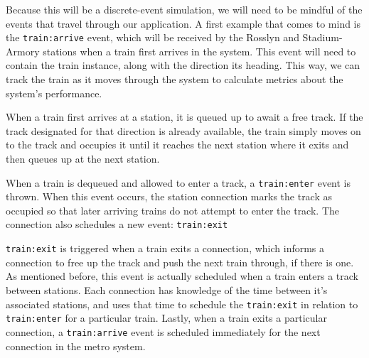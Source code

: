 \documentclass[a4paper,12pt]{article}
\begin{document}
Because this will be a discrete-event simulation, we will need to be mindful of the events that travel through our
application. A first example that comes to mind is the \texttt{train:arrive} event, which will be received by the
Rosslyn and Stadium-Armory stations when a train first arrives in the system. This event will need to contain the train
instance, along with the direction its heading. This way, we can
track the train as it moves through the system to calculate metrics about the system's performance.

When a train first arrives at a station, it is queued up to await a free track. If the track designated for that
direction is already available, the train simply moves on to the track and occupies it until it reaches the next
station where it exits and then queues up at the next station.

When a train is dequeued and allowed to enter a track, a \texttt{train:enter} event is thrown. When this event occurs,
the station connection marks the track as occupied so that later arriving trains do not attempt to enter the track. The
connection also schedules a new event: \texttt{train:exit}

\texttt{train:exit} is triggered when a train exits a connection, which informs a connection to free up the track and
push the next train through, if there is one. As mentioned before, this event is actually scheduled when a train enters
a track between stations. Each connection has knowledge of the time between it's associated stations, and uses that
time to schedule the \texttt{train:exit} in relation to \texttt{train:enter} for a particular train. Lastly, when a
train exits a particular connection, a \texttt{train:arrive} event is scheduled immediately for the next connection in
the metro system.
\end{document}
